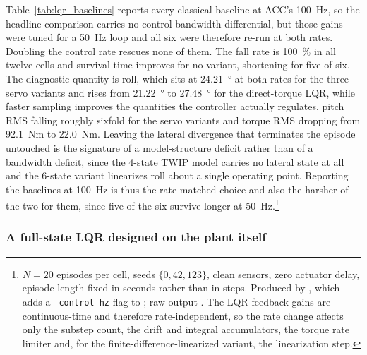 \documentclass[a4paper,fleqn]{cas-dc}
\begin{document}
Table~\ref{tab:lqr_baselines} reports every classical baseline at ACC's
\SI{100}{Hz}, so the headline comparison carries no control-bandwidth
differential, but those gains were tuned for a \SI{50}{Hz} loop and all six were
therefore re-run at both rates. Doubling the control rate rescues none of them.
The fall rate is \SI{100}{\percent} in all twelve cells and survival time
improves for no variant, shortening for five of six. The diagnostic quantity is
roll, which sits at \SI{24.21}{\degree} at both rates for the three servo
variants and rises from \SI{21.22}{\degree} to \SI{27.48}{\degree} for the
direct-torque LQR, while faster sampling improves the quantities the controller
actually regulates, pitch RMS falling roughly sixfold for the servo variants and
torque RMS dropping from \SI{92.1}{Nm} to \SI{22.0}{Nm}. Leaving the lateral
divergence that terminates the episode untouched is the signature of a
model-structure deficit rather than of a bandwidth deficit, since the 4-state
TWIP model carries no lateral state at all and the 6-state variant linearizes
roll about a single operating point. Reporting the baselines at \SI{100}{Hz} is
thus the rate-matched choice and also the harsher of the two for them, since five
of the six survive longer at \SI{50}{Hz}.\footnote{$N{=}20$ episodes per cell,
seeds $\{0,42,123\}$, clean sensors, zero actuator delay, episode length fixed in
seconds rather than in steps. Produced by
, which adds a
\texttt{--control-hz} flag to ; raw output
. The LQR feedback gains are
continuous-time and therefore rate-independent, so the rate change affects only
the substep count, the drift and integral accumulators, the torque rate limiter
and, for the finite-difference-linearized variant, the linearization step.}

\subsubsection{A full-state LQR designed on the plant itself}
\label{sec:full_state_lqr}
\end{document}
